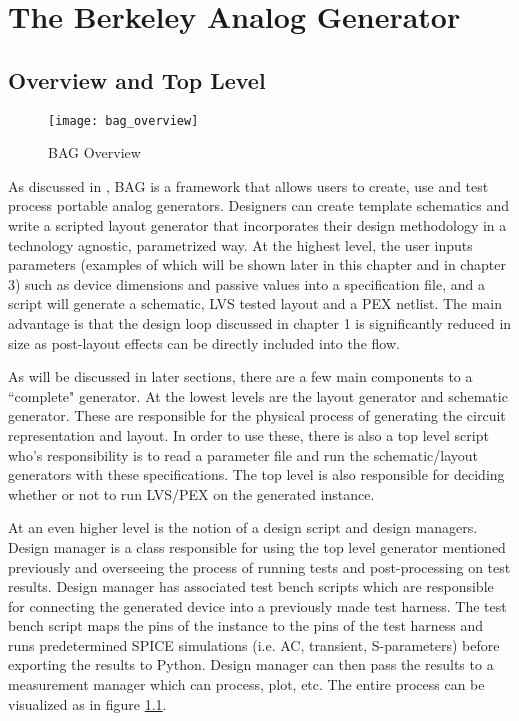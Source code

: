 \chapter{The Berkeley Analog Generator}

\section{Overview and Top Level}
\begin{figure}[h]
\centering
\texttt{[image: bag\_overview]}
\caption{BAG Overview}
\label{fig:bag_top_level}
\end{figure}
As discussed in \cite{chang_bag2:_2018}, BAG is a framework that allows users to create, use and test process portable analog generators. Designers can create template schematics and write a scripted layout generator that incorporates their design methodology in a technology agnostic, parametrized way. At the highest level, the user inputs parameters (examples of which will be shown later in this chapter and in chapter 3) such as device dimensions and passive values into a specification file, and a script will generate a schematic, LVS tested layout and a PEX netlist. The main advantage is that the design loop discussed in chapter 1 is significantly reduced in size as post-layout effects can be directly included into the flow. 

As will be discussed in later sections, there are a few main components to a ``complete" generator. At the lowest levels are the layout generator and schematic generator. These are responsible for the physical process of generating the circuit representation and layout. In order to use these, there is also a top level script who's responsibility is to read a parameter file and run the schematic/layout generators with these specifications. The top level is also responsible for deciding whether or not to run LVS/PEX on the generated instance.

At an even higher level is the notion of a design script and design managers. Design manager is a class responsible for using the top level generator mentioned previously and overseeing the process of running tests and post-processing on test results. Design manager has associated test bench scripts which are responsible for connecting the generated device into a previously made test harness. The test bench script maps the pins of the instance to the pins of the test harness and runs predetermined SPICE simulations (i.e. AC, transient, S-parameters) before exporting the results to Python. Design manager can then pass the results to a measurement manager which can process, plot, etc. The entire process can be visualized as in figure \ref{fig:bag_top_level}.

